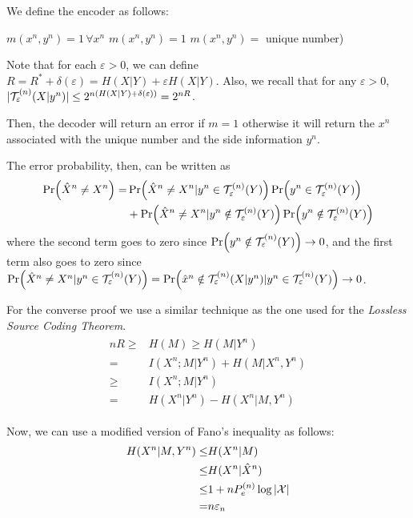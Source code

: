 
We define the encoder as follows:
%
\begin{algorithm}
	{$ m(x^n,y^n) = 1 \, \forall x^n$}
	{
		{$ m(x^n,y^n) = 1$}
		{$m(x^n,y^n) = $ unique number)}
	}
\end{algorithm}

Note that for each $\varepsilon>0$, we can define $R = R^* + \delta(\varepsilon) = H(X|Y) + \varepsilon H(X|Y)$. Also, we recall that for any $\varepsilon>0$, $|\mathcal{T}_\varepsilon^{(n)}(X|y^n)| \leq 2^{n(H(X|Y) + \delta(\varepsilon))} = 2^{nR}$.

Then, the decoder will return an error if $m=1$ otherwise it will return the $x^n$ associated with the unique number and the side information $y^n$.

The error probability, then, can be written as
%
\begin{align}
\begin{split}
\Pr(\hat{X}^n \neq X^n) =& \Pr(\hat{X}^n \neq X^n|y^n\in \mathcal{T}_\varepsilon^{(n)}(Y))\Pr(y^n\in \mathcal{T}_\varepsilon^{(n)}(Y))\\
&+ \Pr(\hat{X}^n \neq X^n|y^n\notin \mathcal{T}_\varepsilon^{(n)}(Y))\Pr(y^n\notin \mathcal{T}_\varepsilon^{(n)}(Y))
\end{split}
\end{align}
%
where the second term goes to zero since $\Pr(y^n\notin \mathcal{T}_\varepsilon^{(n)}(Y)) \rightarrow 0$, and the first term also goes to zero since $\Pr(\hat{X}^n \neq X^n|y^n\in \mathcal{T}_\varepsilon^{(n)}(Y)) = \Pr(\hat{x}^n \notin \mathcal{T}_\varepsilon^{(n)}(X|y^n) |y^n\in \mathcal{T}_\varepsilon^{(n)}(Y)) \rightarrow 0$.

For the converse proof we use a similar technique as the one used for the \textit{Lossless Source Coding Theorem}.
%
\begin{align}
\begin{split}
nR \geq& H(M) \geq H(M|Y^n)\\
=& I(X^n;M|Y^n) + H(M|X^n,Y^n)\\
\geq& I(X^n;M|Y^n)\\
=& H(X^n|Y^n) - H(X^n|M,Y^n)
\end{split}
\end{align}

Now, we can use a modified version of Fano's inequality as follows:
%
\begin{align}
\begin{split}
H(X^n|M,Y^n) \leq& H(X^n|M)\\
\leq& H(X^n|\hat{X}^n)\\
\leq& 1 + n P_e^{(n)}  \log |\mathcal{X}|\\
=& n \varepsilon_n
\end{split}
\end{align}

